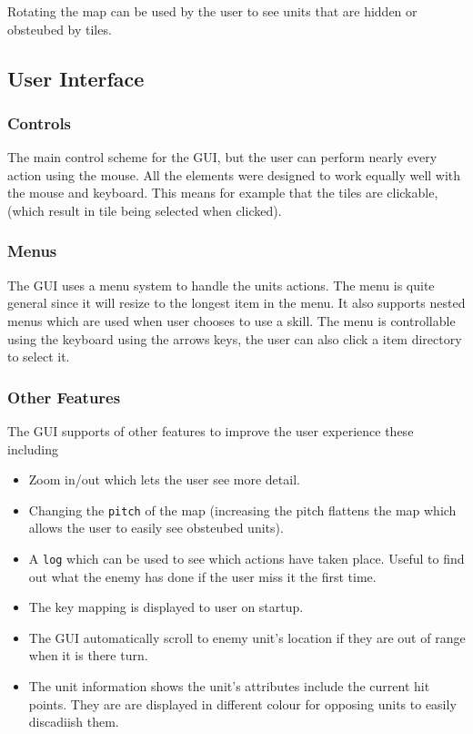 Rotating the map can be used by the user to see units that are hidden or obsteubed by tiles. 

\clearpage
\subsection{User Interface}
\subsubsection{Controls}
The main control scheme for the GUI, but the user can perform nearly every action using the mouse. All the elements were designed to work equally well with the mouse and keyboard. This means for example that the tiles are clickable, (which result in tile being selected when clicked).  


\subsubsection{Menus}

The GUI uses a menu system to handle the units actions. The menu is quite general since it will resize to the longest item in the menu.  It also supports nested menus which are used when user chooses to use a skill. The menu is controllable using the keyboard using the arrows keys, the user can also click a item directory to select it.



\subsubsection{Other Features}
The GUI supports of other features to improve the user experience these including

\begin{itemize}
	\item Zoom in/out which lets the user see more detail. 
	\item Changing the \texttt{pitch} of the map (increasing the pitch flattens the map which allows the user to easily see obsteubed units).
	\item A \texttt{log} which can be used to see which actions have taken place. Useful to find out what the enemy has done if the user miss it the first time.
	\item The key mapping is displayed to user on startup.
	\item The GUI automatically scroll to enemy unit's location if they are out of range when it is there turn.
	\item The unit information shows the unit's attributes include the current hit points. They are are displayed in different colour for opposing units to easily discadiish them. 
\end{itemize}


